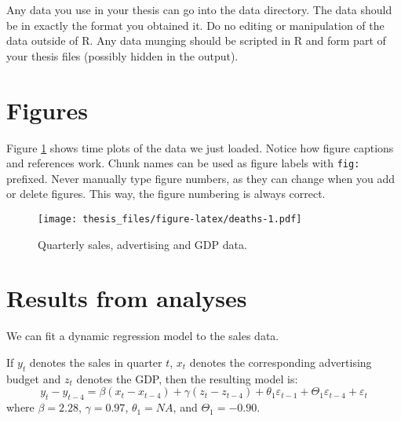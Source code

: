 \documentclass[honours,12pt,twoside]{unswthesis}
\numberwithin{equation}{section}
\begin{document}
\begin{Shaded}
\begin{Highlighting}[]
\OtherTok{\textless{}{-}} \NormalTok{(}\NormalTok{(}\NormalTok{)[,}\SpecialCharTok{{-}}\NormalTok{], }\NormalTok{, }\NormalTok{)}
\end{Highlighting}
\end{Shaded}

Any data you use in your thesis can go into the data directory. The data should be in exactly the format you obtained it. Do no editing or manipulation of the data outside of R. Any data munging should be scripted in R and form part of your thesis files (possibly hidden in the output).

\hypertarget{figures}{%
\section{Figures}\label{figures}}

Figure \ref{fig:deaths} shows time plots of the data we just loaded. Notice how figure captions and references work. Chunk names can be used as figure labels with \texttt{fig:} prefixed. Never manually type figure numbers, as they can change when you add or delete figures. This way, the figure numbering is always correct.

\begin{figure}
\centering
\texttt{[image: thesis\_files/figure-latex/deaths-1.pdf]}
\caption{\label{fig:deaths}Quarterly sales, advertising and GDP data.}
\end{figure}

\hypertarget{results-from-analyses}{%
\section{Results from analyses}\label{results-from-analyses}}

We can fit a dynamic regression model to the sales data.

If \(y_t\) denotes the sales in quarter \(t\), \(x_t\) denotes the corresponding advertising budget and \(z_t\) denotes the GDP, then the resulting model is:
\begin{equation}
  y_t - y_{t-4} = \beta (x_t-x_{t-4}) + \gamma (z_t-z_{t-4}) + \theta_1 \varepsilon_{t-1} + \Theta_1 \varepsilon_{t-4} + \varepsilon_t
\end{equation}
where
\(\beta = 2.28\),
\(\gamma = 0.97\),
\(\theta_1 = NA\),
and
\(\Theta_1 = -0.90\).
\end{document}

